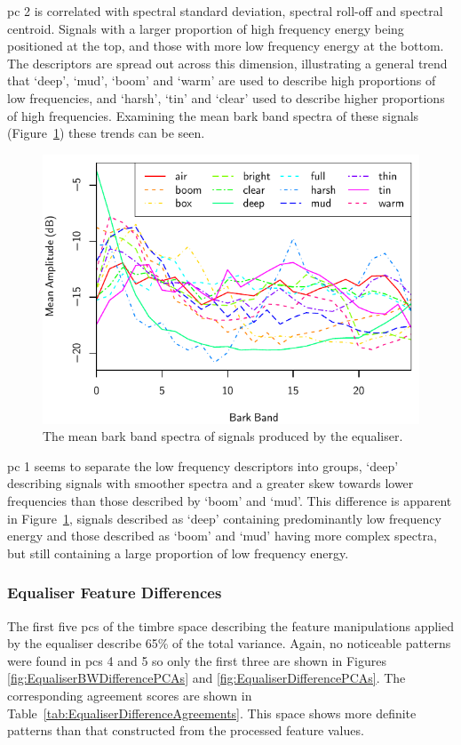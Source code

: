 			\acrshort{pc} 2 is correlated with spectral standard deviation, spectral roll-off and spectral
			centroid.  Signals with a larger proportion of high frequency energy being positioned at the top,
			and those with more low frequency energy at the bottom. The descriptors are spread out across this
			dimension, illustrating a general trend that `deep', `mud', `boom' and `warm' are used to describe
			high proportions of low frequencies, and `harsh', `tin' and `clear' used to describe higher
			proportions of high frequencies. Examining the mean bark band spectra of these signals
			(Figure~\ref{fig:EqualiserProcessedSpectra}) these trends can be seen. 

			\begin{figure}[h!]
				\centering
				\includegraphics{chapter4/Images/EqualiserProcessedSpectra.pdf}
				\caption{The mean bark band spectra of signals produced by the equaliser.}
				\label{fig:EqualiserProcessedSpectra}
			\end{figure}

			\acrshort{pc} 1 seems to separate the low frequency descriptors into groups, `deep' describing
			signals with smoother spectra and a greater skew towards lower frequencies than those described by
			`boom' and `mud'. This difference is apparent in Figure~\ref{fig:EqualiserProcessedSpectra},
			signals described as `deep' containing predominantly low frequency energy and those described as
			`boom' and `mud' having more complex spectra, but still containing a large proportion of low
			frequency energy.

		\subsubsection*{Equaliser Feature Differences}
			The first five \acrshort{pc}s of the timbre space describing the feature manipulations applied by
			the equaliser describe 65\% of the total variance. Again, no noticeable patterns were found in
			\acrshort{pc}s 4 and 5 so only the first three are shown in Figures
			\ref{fig:EqualiserBWDifferencePCAs} and \ref{fig:EqualiserDifferencePCAs}. The corresponding
			agreement scores are shown in Table~\ref{tab:EqualiserDifferenceAgreements}. This space shows more
			definite patterns than that constructed from the processed feature values.

